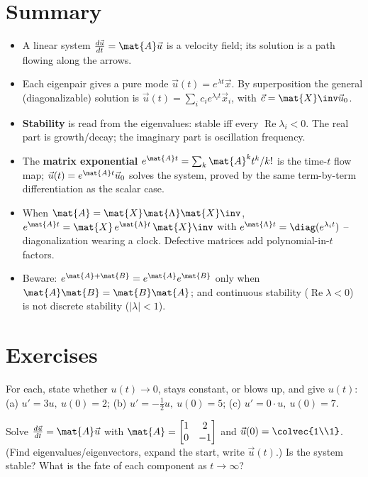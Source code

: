 \section*{Summary}

\begin{itemize}
  \item A linear system $\frac{d\vec{u}}{dt}=\mat{A}\vec{u}$ is a velocity field;
        its solution is a path flowing along the arrows.
  \item Each eigenpair gives a pure mode $\vec{u}(t)=e^{\lambda t}\vec{x}$. By
        superposition the general (diagonalizable) solution is
        $\vec{u}(t)=\sum_i c_i e^{\lambda_i t}\vec{x}_i$, with $\vec{c}=
        \mat{X}\inv\vec{u}_0$.
  \item \textbf{Stability} is read from the eigenvalues: stable iff every
        $\operatorname{Re}\lambda_i < 0$. The real part is growth/decay; the
        imaginary part is oscillation frequency.
  \item The \textbf{matrix exponential} $e^{\mat{A}t}=\sum_k \mat{A}^kt^k/k!$ is
        the time-$t$ flow map; $\vec{u}(t)=e^{\mat{A}t}\vec{u}_0$ solves the
        system, proved by the same term-by-term differentiation as the scalar
        case.
  \item When $\mat{A}=\mat{X}\mat{\Lambda}\mat{X}\inv$,
        $e^{\mat{A}t}=\mat{X}\,e^{\mat{\Lambda}t}\,\mat{X}\inv$ with
        $e^{\mat{\Lambda}t}=\diag(e^{\lambda_i t})$ -- diagonalization wearing a
        clock. Defective matrices add polynomial-in-$t$ factors.
  \item Beware: $e^{\mat{A}+\mat{B}}=e^{\mat{A}}e^{\mat{B}}$ only when
        $\mat{A}\mat{B}=\mat{B}\mat{A}$; and continuous stability ($\operatorname{Re}
        \lambda<0$) is not discrete stability ($|\lambda|<1$).
\end{itemize}

\section{Exercises}
\label{ch25:exercises}

\begin{exercise}
\label{ch25:ex-scalar}
For each, state whether $u(t)\to0$, stays constant, or blows up, and give $u(t)$:
(a) $u'=3u,\ u(0)=2$; (b) $u'=-\tfrac12 u,\ u(0)=5$; (c) $u'=0\cdot u,\ u(0)=7$.
\end{exercise}

\begin{exercise}
\label{ch25:ex-solve}
Solve $\frac{d\vec{u}}{dt}=\mat{A}\vec{u}$ with
$\mat{A}=\begin{bmatrix}1&2\\0&-1\end{bmatrix}$ and $\vec{u}(0)=\colvec{1\\1}$.
(Find eigenvalues/eigenvectors, expand the start, write
$\vec{u}(t)$.) Is the system stable? What is the fate of each component as
$t\to\infty$?
\end{exercise}

